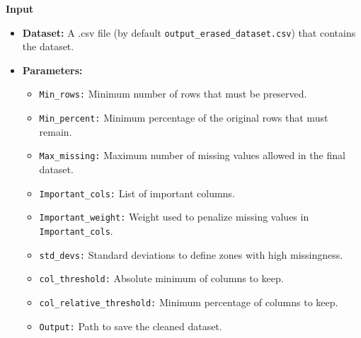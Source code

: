 \documentclass[a4paper,12pt]{article}
\begin{document}
\textbf{Input}
\begin{itemize}
    \item \textbf{Dataset:} A .csv file (by default \texttt{output\_erased\_dataset.csv}) that contains the dataset.
    \item \textbf{Parameters:}
    \begin{itemize}
        \item \texttt{Min\_rows:} Minimum number of rows that must be preserved.
        \item \texttt{Min\_percent:} Minimum percentage of the original rows that must remain.
        \item \texttt{Max\_missing:} Maximum number of missing values allowed in the final dataset.
        \item \texttt{Important\_cols:} List of important columns.
        \item \texttt{Important\_weight:} Weight used to penalize missing values in \texttt{Important\_cols}.
        \item \texttt{std\_devs:} Standard deviations to define zones with high missingness.
        \item \texttt{col\_threshold:} Absolute minimum of columns to keep.
        \item \texttt{col\_relative\_threshold:} Minimum percentage of columns to keep.
        \item \texttt{Output:} Path to save the cleaned dataset.
    \end{itemize}
\end{itemize}
\end{document}
